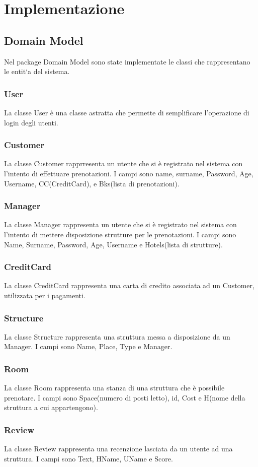 \documentclass{article}
\begin{document}
\section{Implementazione}
\subsection{Domain Model}
Nel package Domain Model sono state implementate le classi che rappresentano le entit`a del sistema.
\subsubsection{User}
La classe User è una classe astratta che permette di semplificare l'operazione di login degli utenti.
\subsubsection{Customer}
La classe Customer rapprresenta un utente che si è registrato nel sistema con l'intento di effettuare prenotazioni. I campi sono name, surname, Password, Age, Username, CC(CreditCard), e Bks(lista di prenotazioni).
\subsubsection{Manager}
La classe Manager rappresenta un utente che si è registrato nel sistema con l'intento di mettere disposizione strutture per le prenotazioni. I campi sono Name, Surname, Password, Age, Username e Hotels(lista di strutture).
\subsubsection{CreditCard}
La classe CreditCard rappresenta una carta di credito associata ad un Customer, utilizzata per i pagamenti.
\subsubsection{Structure}
La classe Structure rappresenta una struttura messa a disposizione da un Manager. I campi sono Name, Place, Type e Manager.
\subsubsection{Room}
La classe Room rappresenta una stanza di una struttura che è possibile prenotare. I campi sono Space(numero di posti letto), id, Cost e H(nome della struttura a cui appartengono).
\subsubsection{Review}
La classe Review rappresenta una recenzione lasciata da un utente ad una struttura. I campi sono Text, HName, UName e Score.
\end{document}
